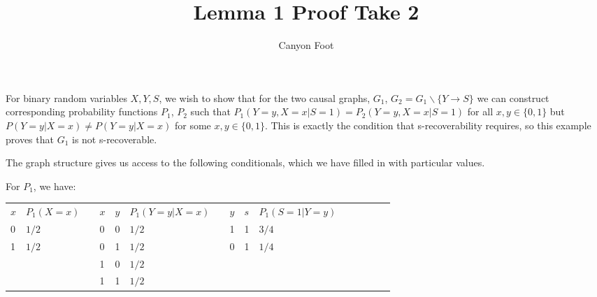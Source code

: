 \documentclass[12pt]{article}
\title{\vspace{-3cm} Lemma 1 Proof Take 2}
\author{Canyon Foot}
\begin{document}
\maketitle

For binary random variables $X,Y,S$, we wish to show that for the two causal graphs, $G_1$, $G_2 = G_1 \backslash \{Y \rightarrow S\}$ we can construct corresponding probability functions $P_1$, $P_2$ such that $P_1(Y = y , X = x | S = 1) = P_2(Y = y , X = x | S = 1)$ for all $x, y \in \{0, 1\}$ but $P(Y = y | X = x) \neq P(Y = y | X = x)$ for some $x,y \in \{0,1\}$. This is exactly the condition that s-recoverability requires, so this example proves that $G_1$ is not s-recoverable.



The graph structure gives us access to the following conditionals, which we have filled in with particular values.

For $P_1$, we have: \\

\begin{tabular}{llll|l|llllllllll}
\multicolumn{1}{l|}{$x$} & $P_1(X = x)$ &  & $x$ & $y$ & $P_1(Y = y | X = x)$ &  & \multicolumn{1}{l|}{$y$} & \multicolumn{1}{l|}{$s$} & $P_1(S = 1 | Y = y)$ &  &  &  &  &  \\ \cline{1-2} \cline{4-6} \cline{8-10}
\multicolumn{1}{l|}{0}   & $1/2$        &  & 0   & 0   & $1/2$                &  & \multicolumn{1}{l|}{1}   & \multicolumn{1}{l|}{1}   & $3/4$                &  &  &  &  &  \\
\multicolumn{1}{l|}{1}   & $1/2$        &  & 0   & 1   & $1/2$                &  & \multicolumn{1}{l|}{0}   & \multicolumn{1}{l|}{1}   & $1/4$                &  &  &  &  &  \\
                         &              &  & 1   & 0   & $1/2$                &  &                          &                          &                      &  &  &  &  &  \\
                         &              &  & 1   & 1   & $1/2$                &  &                          &                          &                      &  &  &  &  & 
\end{tabular}
\end{document}
